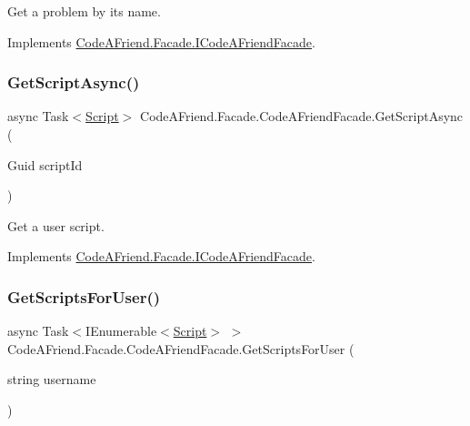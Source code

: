 Get a problem by its name. 



Implements \mbox{\hyperlink{interface_code_a_friend_1_1_facade_1_1_i_code_a_friend_facade_a044ae5a5e7d55904f0fd43eca50650cb}{Code\+A\+Friend.\+Facade.\+I\+Code\+A\+Friend\+Facade}}.

\mbox{\label{class_code_a_friend_1_1_facade_1_1_code_a_friend_facade_aaf0ac4c19567b0078140ab3d6a457e15}} 
\subsubsection{\texorpdfstring{Get\+Script\+Async()}{GetScriptAsync()}}
{\footnotesize\ttfamily async Task$<$\mbox{\hyperlink{class_code_a_friend_1_1_data_model_1_1_script}{Script}}$>$ Code\+A\+Friend.\+Facade.\+Code\+A\+Friend\+Facade.\+Get\+Script\+Async (\begin{DoxyParamCaption}\item[{Guid}]{script\+Id }\end{DoxyParamCaption})}



Get a user script. 



Implements \mbox{\hyperlink{interface_code_a_friend_1_1_facade_1_1_i_code_a_friend_facade_af180522d16e16c3c7eb69324d87278c0}{Code\+A\+Friend.\+Facade.\+I\+Code\+A\+Friend\+Facade}}.

\mbox{\label{class_code_a_friend_1_1_facade_1_1_code_a_friend_facade_a77cd5040946e3a1feaac9fc03cfdb372}} 
\subsubsection{\texorpdfstring{Get\+Scripts\+For\+User()}{GetScriptsForUser()}}
{\footnotesize\ttfamily async Task$<$I\+Enumerable$<$\mbox{\hyperlink{class_code_a_friend_1_1_data_model_1_1_script}{Script}}$>$ $>$ Code\+A\+Friend.\+Facade.\+Code\+A\+Friend\+Facade.\+Get\+Scripts\+For\+User (\begin{DoxyParamCaption}\item[{string}]{username }\end{DoxyParamCaption})}



